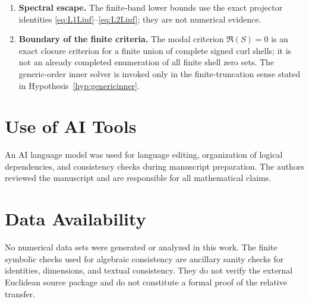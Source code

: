 \documentclass[aps,prd,reprint,superscriptaddress,nofootinbib,floatfix]{revtex4-2}
\theoremstyle{definition}
\theoremstyle{remark}
\begin{document}
\begin{enumerate}[leftmargin=*]
	\item \textbf{Spectral escape.}  The finite-band lower bounds use the exact projector identities \eqref{eq:L1Linf}--\eqref{eq:L2Linf}; they are not numerical evidence.
	\item \textbf{Boundary of the finite criteria.}  The modal criterion \(\mathfrak R(S)=0\) is an exact closure criterion for a finite union of complete signed curl shells; it is not an already completed enumeration of all finite shell zero sets.  The generic-order inner solver is invoked only in the finite-truncation sense stated in Hypothesis~\ref{hyp:genericinner}.
\end{enumerate}



\section*{Use of AI Tools}

An AI language model was used for language editing, organization of logical
dependencies, and consistency checks during manuscript preparation.  The
authors reviewed the manuscript and are responsible for all mathematical
claims.

\section*{Data Availability}

No numerical data sets were generated or analyzed in this work.  The finite symbolic checks used for algebraic consistency are ancillary
sanity checks for identities, dimensions, and textual consistency.  They do not
verify the external Euclidean source package and do not constitute a formal proof
of the relative transfer.
\end{document}
